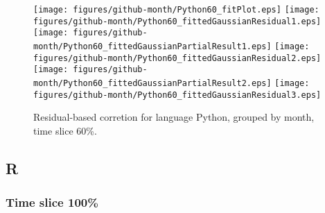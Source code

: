\begin{figure}[hb]
\centering
{}
{\texttt{[image: figures/github-month/Python60\_fitPlot.eps]}}
{\texttt{[image: figures/github-month/Python60\_fittedGaussianResidual1.eps]}}
{\texttt{[image: figures/github-month/Python60\_fittedGaussianPartialResult1.eps]}}
{\texttt{[image: figures/github-month/Python60\_fittedGaussianResidual2.eps]}}
{\texttt{[image: figures/github-month/Python60\_fittedGaussianPartialResult2.eps]}}
{\texttt{[image: figures/github-month/Python60\_fittedGaussianResidual3.eps]}}
\caption{Residual-based corretion for language Python, grouped by month, time slice 60\%.}
\end{figure}


\clearpage 
\newpage 


\subsection{R}

\FloatBarrier

\subsubsection{Time slice 100\%}

